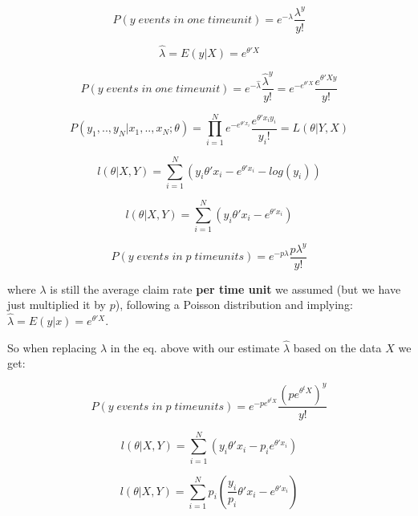\documentclass{article}
\begin{document}
\color{white}

\begin{equation}
 P(y \; events  \; in \; one \; time unit)  = e^{-\lambda} \frac{ \lambda^y }{y!} 
\end{equation}


\begin{equation}
 \hat{\lambda} = E(y|X)  = e^{\theta'X}
\end{equation}


\begin{equation}
 P(y \; events  \; in \; one \; time unit)  = e^{-\hat{\lambda}} \frac{ \hat{\lambda}^y }{y!} = e^{-e^{\theta'X}} \frac{ e^{\theta'Xy} }{y!}
\end{equation}


\begin{equation}
 P(y_1,..,y_N | x_1,..,x_N;\theta)  =  \prod_{i=1}^N  e^{-e^{\theta'x_i}} \frac{ e^{\theta'x_iy_i} }{y_i!} = L(\theta|Y,X)
\end{equation}

\begin{equation}
 l(\theta|X,Y)  =  \sum_{i=1}^N (y_i \theta'  x_i -e^{\theta'x_i} - log(y_i))
\end{equation}

\begin{equation}
 l(\theta|X,Y) = \sum_{i=1}^N (y_i \theta'  x_i -e^{\theta'x_i} )
\end{equation}

\begin{equation}
P(y \; events  \; in \; p \; time units)  = e^{-p\lambda} \frac{ p\lambda^y }{y!} 
\end{equation}

where $\lambda$ is still the average claim rate \textbf{per time unit} we assumed (but we have just multiplied it by $p$), following a Poisson distribution and implying: $\hat{\lambda} = E(y|x)  = e^{\theta'X}$.

So when replacing $\lambda$ in the eq. above with our estimate  $\hat{\lambda}$ based on the data $X$ we get:

\begin{equation}
 P(y \; events  \; in \; p \; time units)  = e^{-pe^{\theta^tX}} \frac{ {(pe^{\theta^tX})}^y }{y!} 
\end{equation}

\begin{equation}
 l(\theta|X,Y)  =  \sum_{i=1}^N (y_i \theta'  x_i - p_ie^{\theta'x_i}  )
\end{equation}

\begin{equation}
 l(\theta|X,Y)  =  \sum_{i=1}^N p_i (\frac{y_i}{p_i} \theta'  x_i -e^{\theta'x_i}  )
\end{equation}
\end{document}
